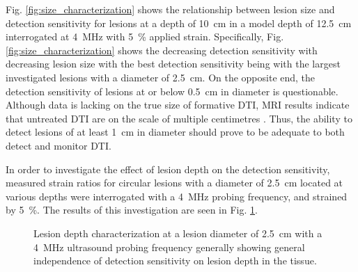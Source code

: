 			Fig. \ref{fig:size_characterization} shows the relationship between lesion size and detection sensitivity for lesions at a depth of \SI{10}{\cm} in a model depth of \SI{12.5}{\cm} interrogated at \SI{4}{\MHz} with \SI{5}{\percent} applied strain. Specifically, Fig. \ref{fig:size_characterization} shows the decreasing detection sensitivity with decreasing lesion size with the best detection sensitivity being with the largest investigated lesions with a diameter of \SI{2.5}{\cm}. On the opposite end, the detection sensitivity of lesions at or below \SI{0.5}{\cm} in diameter is questionable. Although data is lacking on the true size of formative DTI, MRI results indicate that untreated DTI are on the scale of multiple centimetres \cite{solis13}. Thus, the ability to detect lesions of at least \SI{1}{\cm} in diameter should prove to be adequate to both detect and monitor DTI.

			In order to investigate the effect of lesion depth on the detection sensitivity, measured strain ratios for circular lesions with a diameter of \SI{2.5}{\cm} located at various depths were interrogated with a \SI{4}{\MHz} probing frequency, and strained by \SI{5}{\percent}. The results of this investigation are seen in Fig. \ref{fig:depth_characterization}.

			\begin{figure}[!t]
				\centering
				\caption[Quasi-static lesion depth characterization]{Lesion depth characterization at a lesion diameter of \SI{2.5}{\cm} with a \SI{4}{\MHz} ultrasound probing frequency generally showing general independence of detection sensitivity on lesion depth in the tissue.}
				\label{fig:depth_characterization}
			\end{figure}

